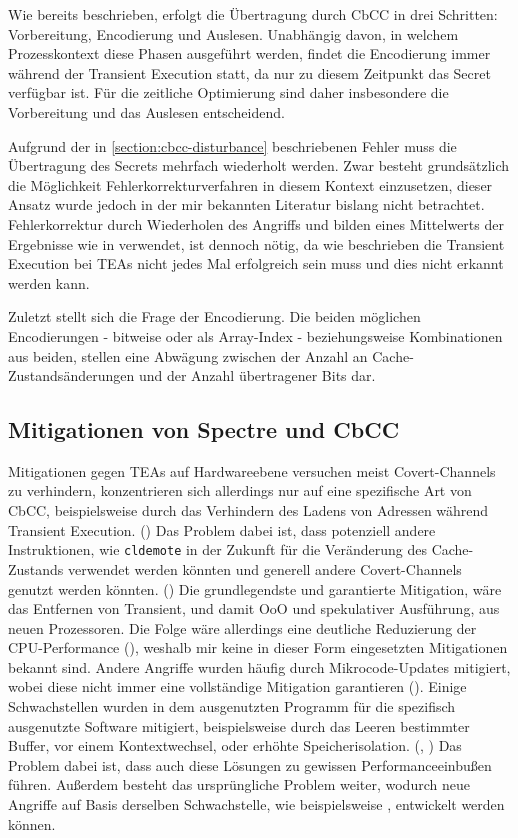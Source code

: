 Wie bereits beschrieben, erfolgt die Übertragung durch \ac{CbCC}
in drei Schritten: Vorbereitung, Encodierung und Auslesen.
Unabhängig davon, in welchem Prozesskontext diese
Phasen ausgeführt werden, findet die Encodierung immer während
der Transient Execution statt, da nur zu diesem Zeitpunkt das
Secret verfügbar ist. Für die zeitliche Optimierung sind daher
insbesondere die Vorbereitung und das Auslesen entscheidend.

Aufgrund der in \ref{section:cbcc-disturbance} beschriebenen
Fehler muss die Übertragung des Secrets mehrfach wiederholt
werden. Zwar besteht grundsätzlich die Möglichkeit
Fehlerkorrekturverfahren in diesem Kontext einzusetzen, dieser
Ansatz wurde jedoch in der mir bekannten Literatur bislang
nicht betrachtet.
Fehlerkorrektur durch Wiederholen des Angriffs und bilden eines
Mittelwerts der Ergebnisse wie in \cite[9]{lipp_meltdown_2020}
verwendet, ist dennoch nötig, da wie beschrieben die Transient
Execution bei \acp{TEA} nicht jedes Mal erfolgreich sein muss und
dies nicht erkannt werden kann.

Zuletzt stellt sich die Frage der Encodierung. Die beiden
möglichen Encodierungen - bitweise oder als Array-Index -
beziehungsweise Kombinationen aus beiden, stellen eine Abwägung
zwischen der Anzahl an Cache-Zustandsänderungen und der
Anzahl übertragener Bits dar.

\subsection{Mitigationen von Spectre und \ac{CbCC}}
Mitigationen gegen \acp{TEA} auf Hardwareebene versuchen
meist Covert-Channels zu verhindern, konzentrieren
sich allerdings nur auf eine spezifische Art von \ac{CbCC},
beispielsweise durch das Verhindern des Ladens von Adressen
während Transient Execution. (\cite[2]{yan_invisispec_2018})
Das Problem dabei ist, dass
potenziell andere Instruktionen, wie \verb|cldemote| in der
Zukunft für die Veränderung des Cache-Zustands verwendet werden
könnten und generell andere Covert-Channels genutzt werden
könnten. (\cite[3,4]{rauscher_systematic_2025})
Die grundlegendste und garantierte Mitigation, wäre das
Entfernen von Transient, und damit \ac{OoO} und spekulativer
Ausführung, aus neuen Prozessoren. Die Folge wäre allerdings eine
deutliche Reduzierung der \ac{CPU}-Performance
(\cite[25]{xiong_survey_2022}), weshalb mir keine in dieser Form
eingesetzten Mitigationen bekannt sind.
Andere Angriffe wurden häufig durch Mikrocode-Updates mitigiert,
wobei diese nicht immer eine vollständige Mitigation garantieren
(\cite[13]{schwarz_zombieload_2019}).
Einige Schwachstellen wurden in dem ausgenutzten Programm für
die spezifisch ausgenutzte Software mitigiert, beispielsweise
durch das Leeren bestimmter Buffer, vor einem Kontextwechsel,
oder erhöhte Speicherisolation.
(\cite[14]{lipp_meltdown_2020}, \cite[13]{schwarz_zombieload_2019})
Das Problem dabei ist, dass auch diese Lösungen zu gewissen
Performanceeinbußen führen. Außerdem besteht das ursprüngliche
Problem weiter, wodurch neue Angriffe auf Basis derselben
Schwachstelle, wie beispielsweise \cite{hertogh_rain_nodate},
entwickelt werden können.
